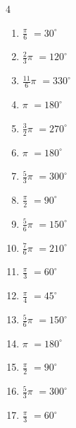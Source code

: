 \begin{multicols}{4}
\begin{enumerate}
  \item $\displaystyle \frac{\pi}{6}$
        $\displaystyle =30^{\circ}$

  \item $\displaystyle \frac{2}{3}\pi$
        $\displaystyle =120^{\circ}$

  \item $\displaystyle \frac{11}{6}\pi$
        $\displaystyle =330^{\circ}$

  \item $\displaystyle \pi$
        $\displaystyle =180^{\circ}$

  \item $\displaystyle \frac{3}{2}\pi$
        $\displaystyle =270^{\circ}$

  \item $\displaystyle \pi$
        $\displaystyle =180^{\circ}$

  \item $\displaystyle \frac{5}{3}\pi$
        $\displaystyle =300^{\circ}$

  \item $\displaystyle \frac{\pi}{2}$
        $\displaystyle =90^{\circ}$

  \item $\displaystyle \frac{5}{6}\pi$
        $\displaystyle =150^{\circ}$

  \item $\displaystyle \frac{7}{6}\pi$
        $\displaystyle =210^{\circ}$

  \item $\displaystyle \frac{\pi}{3}$
        $\displaystyle =60^{\circ}$

  \item $\displaystyle \frac{\pi}{4}$
        $\displaystyle =45^{\circ}$

  \item $\displaystyle \frac{5}{6}\pi$
        $\displaystyle =150^{\circ}$

  \item $\displaystyle \pi$
        $\displaystyle =180^{\circ}$

  \item $\displaystyle \frac{\pi}{2}$
        $\displaystyle =90^{\circ}$

  \item $\displaystyle \frac{5}{3}\pi$
        $\displaystyle =300^{\circ}$

  \item $\displaystyle \frac{\pi}{3}$
        $\displaystyle =60^{\circ}$


\end{enumerate}
\end{multicols}
